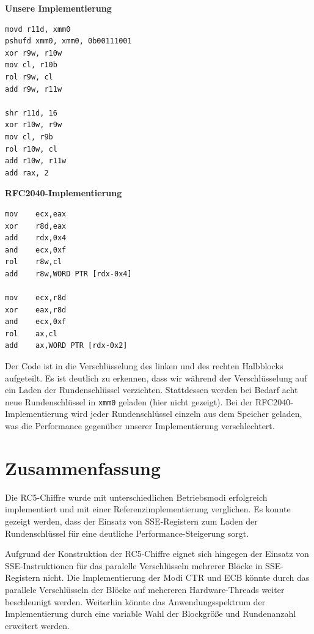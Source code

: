 \documentclass[course=erap]{aspdoc}
\begin{document}
\begin{multicols}{2}

\noindent \textbf{Unsere Implementierung}

\begin{verbatim}
movd r11d, xmm0
pshufd xmm0, xmm0, 0b00111001
xor r9w, r10w
mov cl, r10b
rol r9w, cl
add r9w, r11w

shr r11d, 16
xor r10w, r9w
mov cl, r9b
rol r10w, cl
add r10w, r11w
add rax, 2
\end{verbatim}

\noindent \textbf{RFC2040-Implementierung}

\begin{verbatim}
mov    ecx,eax
xor    r8d,eax
add    rdx,0x4
and    ecx,0xf
rol    r8w,cl
add    r8w,WORD PTR [rdx-0x4]

mov    ecx,r8d
xor    eax,r8d
and    ecx,0xf
rol    ax,cl
add    ax,WORD PTR [rdx-0x2]

\end{verbatim}

\end{multicols}

\noindent Der Code ist in die Verschlüsselung des linken und des rechten Halbblocks aufgeteilt. Es ist deutlich zu erkennen, dass wir während der Verschlüsselung auf ein Laden der Rundenschlüssel verzichten. Stattdessen werden bei Bedarf acht neue Rundenschlüssel in \texttt{xmm0} geladen (hier nicht gezeigt). Bei der RFC2040-Implementierung wird jeder Rundenschlüssel einzeln aus dem Speicher geladen, was die Performance gegenüber unserer Implementierung verschlechtert.

\section{Zusammenfassung}

Die RC5-Chiffre wurde mit unterschiedlichen Betriebsmodi erfolgreich implementiert und mit einer Referenzimplementierung verglichen. Es konnte gezeigt werden, dass der Einsatz von SSE-Registern zum Laden der Rundenschlüssel für eine deutliche Performance-Steigerung sorgt.\bigbreak

Aufgrund der Konstruktion der RC5-Chiffre eignet sich hingegen der Einsatz von SSE-Instruktionen für das paralelle Verschlüsseln mehrerer Blöcke in SSE-Registern nicht. Die Implementierung der Modi CTR und ECB könnte durch das parallele Verschlüsseln der Blöcke auf mehereren Hardware-Threads weiter beschleunigt werden. Weiterhin könnte das Anwendungsspektrum der Implementierung durch eine variable Wahl der Blockgröße und Rundenanzahl erweitert werden.

\printbibliography
\end{document}
